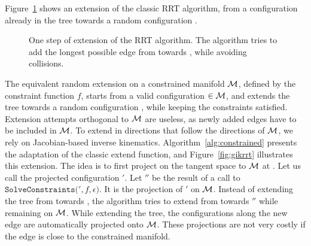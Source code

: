 Figure~\ref{fig:rrt-extend} shows an extension of the classic RRT
algorithm, from a configuration already in the tree  towards
a random configuration .

\begin{figure}
  \centering


  \caption{One step of extension of the RRT algorithm. The algorithm
    tries to add the longest possible edge from  towards
    , while avoiding collisions.}
  \label{fig:rrt-extend}
\end{figure}

The equivalent random extension on a constrained manifold $\mathcal{M}$,
defined by the constraint function $f$, starts from a valid
configuration $ \in \mathcal{M}$, and extends the tree
towards a random configuration , while keeping the
constraints satisfied. Extension attempts orthogonal to $\mathcal{M}$
are useless, as newly added edges have to be included in
$\mathcal{M}$. To extend in directions that follow the directions of
$\mathcal{M}$, we rely on Jacobian-based inverse
kinematics. Algorithm~\ref{alg:constrained} presents the adaptation of
the classic extend function, and Figure~\ref{fig:gikrrt} illustrates
this extension. The idea is to first project  on the
tangent space to $\mathcal{M}$ at . Let us call the
projected configuration $'$. Let $''$ be the
result of a call to $\texttt{SolveConstraints}($$',f,\epsilon)$.
It is the projection of $'$ on $\mathcal{M}$. Instead of
extending the tree from  towards , the
algorithm tries to extend from  towards $''$
while remaining on $\mathcal{M}$. While extending the tree, the
configurations along the new edge are automatically projected onto
$\mathcal{M}$. These projections are not very costly if the edge is
close to the constrained manifold.

